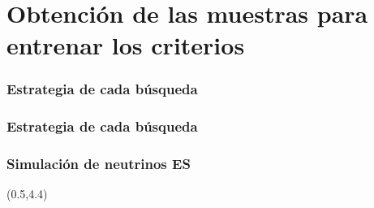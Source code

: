 \section[Muestras]{Obtenci\'on de las muestras para entrenar los criterios}

\begin{frame}
 \frametitle{Estrategia de cada b\'usqueda}
 \begin{center}
 \end{center}
\end{frame}

\begin{frame}
 \frametitle{Estrategia de cada b\'usqueda}
 \begin{center}
 \end{center}
\end{frame}

\begin{frame}
 \frametitle{Simulaci\'on de neutrinos ES}
 \begin{textblock}{14.5}(0.5,4.4)
 \end{textblock}
 
\end{frame}

